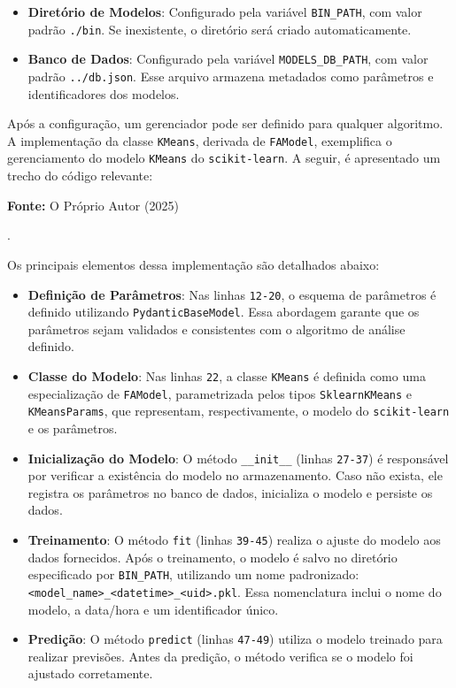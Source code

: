 \begin{itemize}
    \item \textbf{Diretório de Modelos}: Configurado pela variável \texttt{BIN\_PATH}, com valor padrão \texttt{./bin}. Se inexistente, o diretório será criado automaticamente.
    \item \textbf{Banco de Dados}: Configurado pela variável \texttt{MODELS\_DB\_PATH}, com valor padrão \texttt{../db.json}. Esse arquivo armazena metadados como parâmetros e identificadores dos modelos.
\end{itemize}

Após a configuração, um gerenciador pode ser definido para qualquer algoritmo. A implementação da classe \texttt{KMeans}, derivada de \texttt{FAModel}, exemplifica o gerenciamento do modelo \texttt{KMeans} do \texttt{scikit-learn}. A seguir, é apresentado um trecho do código relevante:

\begin{center}
    
    \centerline{\textbf{Fonte:} O Próprio Autor (2025)}
\end{center}

\hfill \break.

Os principais elementos dessa implementação são detalhados abaixo:

\begin{itemize}
    \item \textbf{Definição de Parâmetros}: Nas linhas \texttt{12-20}, o esquema de parâmetros é definido utilizando \texttt{PydanticBaseModel}. Essa abordagem garante que os parâmetros sejam validados e consistentes com o algoritmo de análise definido.
    \item \textbf{Classe do Modelo}: Nas linhas \texttt{22}, a classe \texttt{KMeans} é definida como uma especialização de \texttt{FAModel}, parametrizada pelos tipos \texttt{SklearnKMeans} e \texttt{KMeansParams}, que representam, respectivamente, o modelo do \texttt{scikit-learn} e os parâmetros.
    \item \textbf{Inicialização do Modelo}: O método \texttt{\_\_init\_\_} (linhas \texttt{27-37}) é responsável por verificar a existência do modelo no armazenamento. Caso não exista, ele registra os parâmetros no banco de dados, inicializa o modelo e persiste os dados.
    \item \textbf{Treinamento}: O método \texttt{fit} (linhas \texttt{39-45}) realiza o ajuste do modelo aos dados fornecidos. Após o treinamento, o modelo é salvo no diretório especificado por \texttt{BIN\_PATH}, utilizando um nome padronizado: \texttt{<model\_name>\_<datetime>\_<uid>.pkl}. Essa nomenclatura inclui o nome do modelo, a data/hora e um identificador único.
    \item \textbf{Predição}: O método \texttt{predict} (linhas \texttt{47-49}) utiliza o modelo treinado para realizar previsões. Antes da predição, o método verifica se o modelo foi ajustado corretamente.
\end{itemize}

